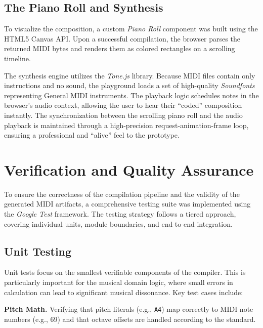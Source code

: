\subsection{The Piano Roll and Synthesis}\label{detail-subsec:the-piano-roll-and-synthesis}

To visualize the composition, a custom \textit{Piano Roll} component was built using the HTML5 Canvas API\@.
Upon a successful compilation, the browser parses the returned MIDI bytes and renders them as colored rectangles on a
scrolling timeline.

The synthesis engine utilizes the \textit{Tone.js} library.
Because MIDI files contain only instructions and no sound, the playground loads a set of high-quality
\textit{Soundfonts} representing General MIDI instruments.
The playback logic schedules notes in the browser's audio context, allowing the user to hear their ``coded'' composition
instantly.
The synchronization between the scrolling piano roll and the audio playback is maintained through a high-precision
request-animation-frame loop, ensuring a professional and ``alive'' feel to the prototype.


\section{Verification and Quality Assurance}\label{detail-sec:implementation-verification}

To ensure the correctness of the compilation pipeline and the validity of the generated MIDI artifacts, a comprehensive
testing suite was implemented using the \textit{Google Test} framework.
The testing strategy follows a tiered approach, covering individual units, module boundaries, and end-to-end
integration.

\subsection{Unit Testing}\label{detail-subsec:unit-testing}

Unit tests focus on the smallest verifiable components of the compiler.
This is particularly important for the musical domain logic, where small errors in calculation can lead to significant
musical dissonance.
Key test cases include:

\noindent \textbf{Pitch Math.} Verifying that pitch literals (e.g., \texttt{A4}) map correctly to MIDI note
numbers (e.g.,
69) and that octave offsets are handled according to the standard.

